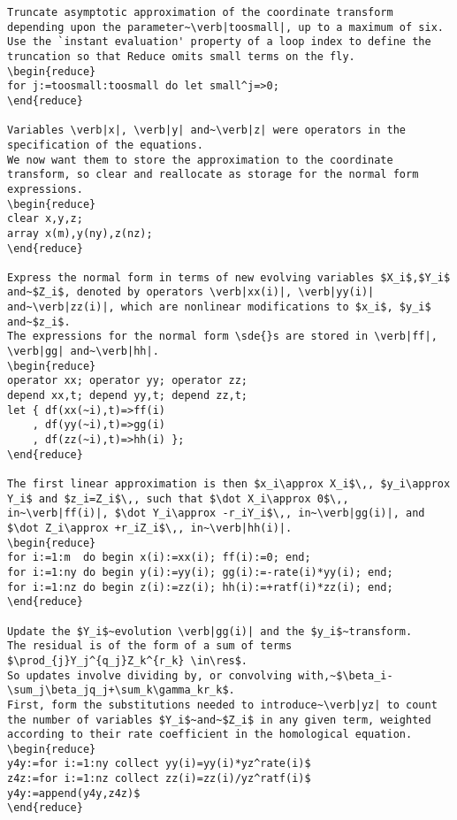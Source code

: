 \documentclass[11pt,a5paper]{article}
\newcommand{\res}{\operatorname{Res}}
\begin{document}
\begin{reduce}
\begin{verbatim}
Truncate asymptotic approximation of the coordinate transform depending upon the parameter~\verb|toosmall|, up to a maximum of six.
Use the `instant evaluation' property of a loop index to define the truncation so that Reduce omits small terms on the fly.
\begin{reduce}
for j:=toosmall:toosmall do let small^j=>0;
\end{reduce}

Variables \verb|x|, \verb|y| and~\verb|z| were operators in the specification of the equations.
We now want them to store the approximation to the coordinate transform, so clear and reallocate as storage for the normal form expressions.
\begin{reduce}
clear x,y,z;
array x(m),y(ny),z(nz);
\end{reduce}

Express the normal form in terms of new evolving variables $X_i$,$Y_i$ and~$Z_i$, denoted by operators \verb|xx(i)|, \verb|yy(i)| and~\verb|zz(i)|, which are nonlinear modifications to $x_i$, $y_i$ and~$z_i$.
The expressions for the normal form \sde{}s are stored in \verb|ff|, \verb|gg| and~\verb|hh|.
\begin{reduce}
operator xx; operator yy; operator zz;
depend xx,t; depend yy,t; depend zz,t;
let { df(xx(~i),t)=>ff(i) 
    , df(yy(~i),t)=>gg(i) 
    , df(zz(~i),t)=>hh(i) };
\end{reduce}

The first linear approximation is then $x_i\approx X_i$\,, $y_i\approx Y_i$ and $z_i=Z_i$\,, such that $\dot X_i\approx 0$\,, in~\verb|ff(i)|, $\dot Y_i\approx -r_iY_i$\,, in~\verb|gg(i)|, and  $\dot Z_i\approx +r_iZ_i$\,, in~\verb|hh(i)|.
\begin{reduce}
for i:=1:m  do begin x(i):=xx(i); ff(i):=0; end;
for i:=1:ny do begin y(i):=yy(i); gg(i):=-rate(i)*yy(i); end;
for i:=1:nz do begin z(i):=zz(i); hh(i):=+ratf(i)*zz(i); end;
\end{reduce}

Update the $Y_i$~evolution \verb|gg(i)| and the $y_i$~transform.
The residual is of the form of a sum of terms $\prod_{j}Y_j^{q_j}Z_k^{r_k} \in\res$.
So updates involve dividing by, or convolving with,~$\beta_i-\sum_j\beta_jq_j+\sum_k\gamma_kr_k$.
First, form the substitutions needed to introduce~\verb|yz| to count the number of variables $Y_i$~and~$Z_i$ in any given term, weighted according to their rate coefficient in the homological equation.
\begin{reduce}
y4y:=for i:=1:ny collect yy(i)=yy(i)*yz^rate(i)$
z4z:=for i:=1:nz collect zz(i)=zz(i)/yz^ratf(i)$
y4y:=append(y4y,z4z)$
\end{reduce}





\end{verbatim}
\end{reduce}
\end{document}

